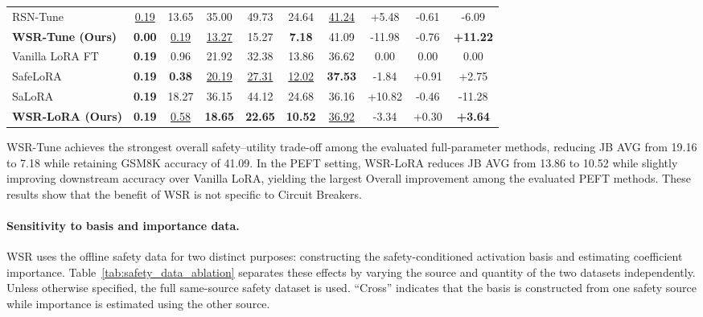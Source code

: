 \documentclass{article}
\begin{document}
\begin{table}[t]
{\begin{tabular}{lccccccccc}
RSN-Tune
& \uline{0.19} & 13.65 & 35.00 & 49.73 & 24.64 & \uline{41.24}
& +5.48 & -0.61 & -6.09 \\

\textbf{WSR-Tune (Ours)}
& \textbf{0.00} & \uline{0.19} & \uline{13.27} & 15.27 & \textbf{7.18} & 41.09
& -11.98 & -0.76 & \cellcolor{green!20}\textbf{+11.22} \\

\midrule

Vanilla LoRA FT
& \textbf{0.19} & 0.96 & 21.92 & 32.38 & 13.86 & 36.62
& 0.00 & 0.00 & 0.00 \\

SafeLoRA
& \textbf{0.19} & \textbf{0.38} & \uline{20.19} & \uline{27.31} & \uline{12.02} & \textbf{37.53}
& -1.84 & +0.91 & +2.75 \\

SaLoRA
& \textbf{0.19} & 18.27 & 36.15 & 44.12 & 24.68 & 36.16
& +10.82 & -0.46 & -11.28 \\

\textbf{WSR-LoRA (Ours)}
& \textbf{0.19} & \uline{0.58} & \textbf{18.65} & \textbf{22.65} & \textbf{10.52} & \uline{36.92}
& -3.34 & +0.30 & \cellcolor{green!20}\textbf{+3.64} \\

\bottomrule
\end{tabular}
}
\end{table}







WSR-Tune achieves the strongest overall safety--utility trade-off among the evaluated full-parameter methods, reducing JB AVG from 19.16 to 7.18 while retaining GSM8K accuracy of 41.09. In the PEFT setting, WSR-LoRA reduces JB AVG from 13.86 to 10.52 while slightly improving downstream accuracy over Vanilla LoRA, yielding the largest Overall improvement among the evaluated PEFT methods. These results show that the benefit of WSR is
not specific to Circuit Breakers.

\paragraph{Sensitivity to basis and importance data.}
WSR uses the offline safety data for two distinct purposes: constructing the safety-conditioned activation basis and estimating coefficient importance. Table~\ref{tab:safety_data_ablation} separates these effects by varying the source and quantity of the two datasets independently. Unless otherwise specified, the full same-source safety dataset is used. ``Cross'' indicates that the basis is constructed from one safety source while importance is estimated using the other source.
\end{document}
